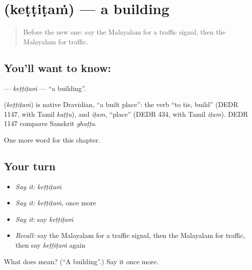 \section[\texorpdfstring{\ml{കെട്ടിടം} (keṭṭiṭaṁ)}{കെട്ടിടം (keṭṭiṭaṁ)}]{ (keṭṭiṭaṁ) — a building}

\label{lesson:ML-C278-kettitam}



\begin{quote}
Before the new one: say the Malayalam for a traffic signal, then the Malayalam for traffic.
\end{quote}

\subsection*{You'll want to know: }
\textbf{} — \emph{keṭṭiṭaṁ} — \textquotedblleft{}a building\textquotedblright{}.

\begin{cousinweb}
\textbf{} (\emph{keṭṭiṭaṁ}) is native Dravidian, \textquotedblleft{}a built place\textquotedblright{}: the verb \textquotedblleft{}to tie, build\textquotedblright{} (DEDR 1147, with Tamil \emph{kaṭṭu}), and \emph{iṭam}, \textquotedblleft{}place\textquotedblright{} (DEDR 434, with Tamil \emph{iṭam}). DEDR 1147 compares Sanskrit \emph{ghaṭṭa}.
\end{cousinweb}

\begin{grammarlens}[title={What you've built}]
One more word for this chapter.
\end{grammarlens}

\subsection*{Your turn}
\begin{itemize}
\raggedright
  \item \emph{Say it:} \emph{keṭṭiṭaṁ}
  \item \emph{Say it:} \emph{keṭṭiṭaṁ}, once more
  \item \emph{Say it:} say \emph{keṭṭiṭaṁ}
  \item \emph{Recall:} say the Malayalam for a traffic signal, then the Malayalam for traffic, then say \emph{keṭṭiṭaṁ} again
\end{itemize}

\begin{tcolorbox}[breakable,colback=teal!4,colframe=teal!35!black,title={Before you move on}]
What does  mean? (\textquotedblleft{}A building\textquotedblright{}.) Say it once more.
\end{tcolorbox}
